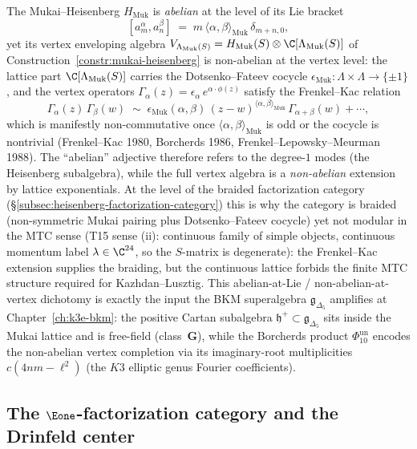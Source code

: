 \begin{remark}
\label{rem:brf-abelian-lie-nonabelian-vertex-frenkel-kac}
The Mukai--Heisenberg $H_{\mathrm{Muk}}$ is \emph{abelian} at the level
of its Lie bracket
\[
 [a^\alpha_m, a^\beta_n]
 \;=\; m \, \langle \alpha, \beta \rangle_{\mathrm{Muk}} \, \delta_{m+n, 0},
\]
yet its vertex enveloping algebra
$V_{\Lambda_{\mathrm{Muk}}(S)} = H_{\mathrm{Muk}}(S) \otimes
\C[\Lambda_{\mathrm{Muk}}(S)]$ of
Construction~\ref{constr:mukai-heisenberg} is non-abelian at the
vertex level: the lattice part $\C[\Lambda_{\mathrm{Muk}}(S)]$
carries the Dotsenko--Fateev cocycle
$\epsilon_{\mathrm{Muk}} \colon \Lambda \times \Lambda \to \{\pm 1\}$,
and the vertex operators
$\Gamma_\alpha(z) = \epsilon_\alpha\, e^{\alpha \cdot \phi(z)}$
satisfy the Frenkel--Kac relation
\[
 \Gamma_\alpha(z) \, \Gamma_\beta(w)
 \;\sim\; \epsilon_{\mathrm{Muk}}(\alpha, \beta)\,
 (z - w)^{\langle \alpha, \beta \rangle_{\mathrm{Muk}}}\,
 \Gamma_{\alpha + \beta}(w) + \cdots,
\]
which is manifestly non-commutative once $\langle \alpha, \beta
\rangle_{\mathrm{Muk}}$ is odd or the cocycle is nontrivial
(Frenkel--Kac 1980, Borcherds 1986, Frenkel--Lepowsky--Meurman 1988).
The ``abelian'' adjective therefore refers to the degree-$1$ modes
(the Heisenberg subalgebra), while the full vertex algebra is a
\emph{non-abelian} extension by lattice exponentials. At the level
of the braided factorization category
(\S\ref{subsec:heisenberg-factorization-category}) this is
why the category is braided (non-symmetric Mukai pairing plus
Dotsenko--Fateev cocycle) yet not modular in the MTC sense (T15 sense (ii): continuous family of
simple objects, continuous momentum label $\lambda \in \C^{24}$, so the $S$-matrix is degenerate):
the Frenkel--Kac extension supplies the braiding, but the
continuous lattice forbids the finite MTC structure required
for Kazhdan--Lusztig. This abelian-at-Lie / non-abelian-at-vertex
dichotomy is exactly the input the BKM superalgebra
$\mathfrak{g}_{\Delta_5}$ amplifies at
Chapter~\ref{ch:k3e-bkm}: the positive Cartan subalgebra
$\mathfrak{h}^+ \subset \mathfrak{g}_{\Delta_5}$ sits inside the
Mukai lattice and is free-field (class~$\mathbf{G}$), while the
Borcherds product $\Phi_{10}^{\mathrm{un}}$ encodes the non-abelian vertex
completion via its imaginary-root multiplicities
$c(4nm - \ell^2)$ (the $K3$ elliptic genus Fourier coefficients).
\end{remark}


\subsection{The \texorpdfstring{$\Eone$}{E1}-factorization category and the Drinfeld center}
\label{subsec:e1-factorization-center}

